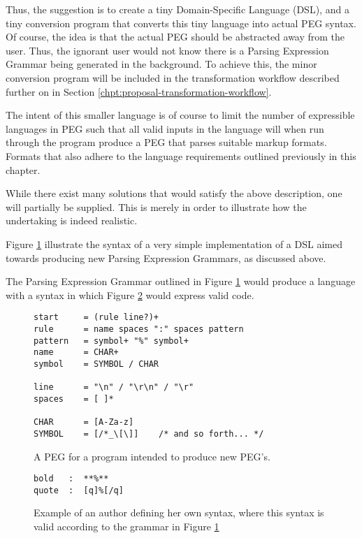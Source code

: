\documentclass{scrreprt}
\begin{document}
Thus, the suggestion is to create a tiny Domain-Specific Language (DSL), and a tiny conversion program that converts this tiny language into actual PEG syntax. Of course, the idea is that the actual PEG should be abstracted away from the user. Thus, the ignorant user would not know there is a Parsing Expression Grammar being generated in the background. To achieve this, the minor conversion program will be included in the transformation workflow described further on in Section \ref{chpt:proposal-transformation-workflow}. 

The intent of this smaller language is of course to limit the number of expressible languages in PEG such that all valid inputs in the language will when run through the program produce a PEG that parses suitable markup formats. Formats that also adhere to the language requirements outlined previously in this chapter.

While there exist many solutions that would satisfy the above description, one will partially be supplied. This is merely in order to illustrate how the undertaking is indeed realistic.

Figure \ref{code:fupd-peg} illustrate the syntax of a very simple implementation of a DSL aimed towards producing new Parsing Expression Grammars, as discussed above.

The Parsing Expression Grammar outlined in Figure \ref{code:fupd-peg} would produce a language with a syntax in which Figure \ref{code:fupd-example-usage-syntax} would express valid code.


\begin{figure}[h]
\begin{lstlisting}
start     = (rule line?)+
rule      = name spaces ":" spaces pattern
pattern   = symbol+ "%" symbol+
name      = CHAR+
symbol    = SYMBOL / CHAR

line      = "\n" / "\r\n" / "\r"
spaces    = [ ]*

CHAR      = [A-Za-z]
SYMBOL    = [/*_\[\]]    /* and so forth... */
\end{lstlisting}
\caption{A PEG for a program intended to produce new PEG's.}
\label{code:fupd-peg}
\end{figure}


\begin{figure}[h]
\begin{lstlisting}
bold   :  **%**
quote  :  [q]%[/q]
\end{lstlisting}
\caption{Example of an author defining her own syntax, where this syntax is valid according to the grammar in Figure \ref{code:fupd-peg}}
\label{code:fupd-example-usage-syntax}
\end{figure}
\end{document}
